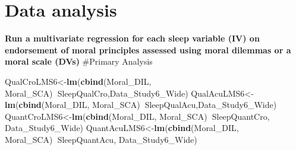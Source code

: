 \documentclass[
]{book}
\newenvironment{Shaded}{\begin{snugshade}}{\end{snugshade}}
\newcommand{\KeywordTok}[1]{\textcolor[rgb]{0.13,0.29,0.53}{\textbf{#1}}}
\newcommand{\NormalTok}[1]{#1}
\newcommand{\OperatorTok}[1]{\textcolor[rgb]{0.81,0.36,0.00}{\textbf{#1}}}
\begin{document}
\hypertarget{data-analysis-5}{%
\section{Data analysis}\label{data-analysis-5}}

\textbf{Run a multivariate regression for each sleep variable (IV) on endorsement of moral principles assessed using moral dilemmas or a moral scale (DVs)}
\#Primary Analysis

\begin{Shaded}
\begin{Highlighting}[]
\NormalTok{QualCroLMS6<-}\KeywordTok{lm}\NormalTok{(}\KeywordTok{cbind}\NormalTok{(Moral_DIL, Moral_SCA)}\OperatorTok{~}\NormalTok{SleepQualCro,Data_Study6_Wide)}
\NormalTok{QualAcuLMS6<-}\KeywordTok{lm}\NormalTok{(}\KeywordTok{cbind}\NormalTok{(Moral_DIL, Moral_SCA)}\OperatorTok{~}\NormalTok{SleepQualAcu,Data_Study6_Wide)}
\NormalTok{QuantCroLMS6<-}\KeywordTok{lm}\NormalTok{(}\KeywordTok{cbind}\NormalTok{(Moral_DIL, Moral_SCA)}\OperatorTok{~}\NormalTok{SleepQuantCro, Data_Study6_Wide)}
\NormalTok{QuantAcuLMS6<-}\KeywordTok{lm}\NormalTok{(}\KeywordTok{cbind}\NormalTok{(Moral_DIL, Moral_SCA)}\OperatorTok{~}\NormalTok{SleepQuantAcu, Data_Study6_Wide)}
\end{Highlighting}
\end{Shaded}
\end{document}
